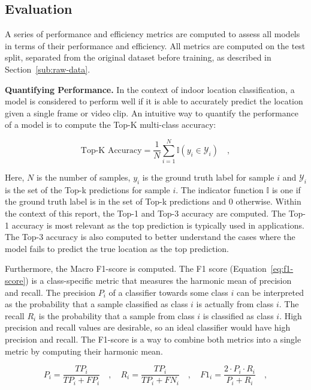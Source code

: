 \documentclass[a4paper]{article}
\begin{document}
\subsection{Evaluation} %
\label{sub:evaluation}

A series of performance and efficiency metrics are computed to assess all models
in terms of their performance and efficiency. All metrics are computed on the
test split, separated from the original dataset before training, as
described in Section~\ref{sub:raw-data}.

\textbf{Quantifying Performance.} In the context of indoor location
classification, a model is considered to perform well if it is able to
accurately predict the location given a single frame or video clip. An intuitive
way to quantify the performance of a model is to compute the Top-K multi-class
accuracy:

\begin{equation}
  \text{Top-K Accuracy} = \frac{1}{N} \sum_{i=1}^{N} \mathbb{I}(y_i \in
  \mathcal{Y}_i) \quad ,
  \label{eq:top-k-accuracy}
\end{equation}

Here, $N$ is the number of samples, $y_i$ is the ground truth label for sample
$i$ and $\mathcal{Y}_i$ is the set of the Top-k predictions for sample $i$. The
indicator function $\mathbb{I}$ is one if the ground truth label is in the set
of Top-k predictions and 0 otherwise. Within the context of this report, the
Top-1 and Top-3 accuracy are computed. The Top-1 accuracy is most relevant as
the top prediction is typically used in applications. The Top-3 accuracy is also
computed to better understand the cases where the model fails to predict the
true location as the top prediction.


Furthermore, the Macro F1-score is computed. The F1 score
(Equation~\ref{eq:f1-score}) is a class-specific metric that measures the
harmonic mean of precision and recall. The precision $P_i$ of a classifier
towards some class $i$ can be interpreted as the probability that a sample
classified as class $i$ is actually from class $i$. The recall $R_i$ is the
probability that a sample from class $i$ is classified as class $i$. High
precision and recall values are desirable, so an ideal classifier would have
high precision and recall. The F1-score is a way to combine both metrics into a
single metric by computing their harmonic mean.

\begin{equation}
  P_i = \frac{TP_i}{TP_i + FP_i} \quad , \quad R_i = \frac{TP_i}{TP_i + FN_i}
  \quad , \quad F1_i = \frac{2 \cdot P_i \cdot R_i}{P_i + R_i} \quad ,
  \label{eq:f1-score}
\end{equation}
\end{document}

